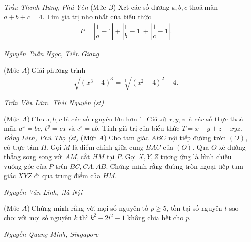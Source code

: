 \begin{multicols}{2}
\begin{figure}[H]
		\vspace*{-5pt}
		\centering
		\captionsetup{labelformat= empty, justification=centering}
		\vspace*{-15pt}
	\end{figure}
	\hfill	\textit{Trần Thanh Hưng, Phú Yên}
	\vskip 0.05cm
	{}
	(Mức $B$) Xét các số dương $a,b,c$ thoả mãn $a+b+c=4$. Tìm giá trị nhỏ nhất của biểu thức 
	\begin{align*}
		P=\left|\dfrac 1a-1\right|+\left|\dfrac 1b-1\right|+\left|\dfrac 1c-1\right|.
	\end{align*}
	\begin{flushright}
		\textit{Nguyễn Tuấn Ngọc, Tiền Giang}
	\end{flushright}
	{}
	(Mức $A$) Giải phương trình
	\begin{align*}
		\sqrt{(x^3-4)^3}=\sqrt[3]{(x^2+4)^2}+4.
	\end{align*} 
	\begin{flushright}
		\textit{Trần Văn Lâm, Thái Nguyên (st)}
	\end{flushright}
	{}
	(Mức $A$) Cho $a,b,c$ là các số nguyên lớn hơn $1$. Giả sử $x,y,z$ là các số thực thoả mãn $a^x=bc$, $b^y=ca$ và $c^z=ab$. Tính giá trị của biểu thức $T=x+y+z-xyz$. 
	\vskip 0.05cm
		\hfill \textit{Bằng Linh, Phú Thọ (st)}
	\vskip 0.05cm
	\columnbreak
	{}
	(Mức $A$) Cho tam giác $ABC$ nội tiếp đường tròn $(O)$, có trực tâm $H$. Gọi $M$ là điểm chính giữa cung $BAC$ của $(O)$. Qua $O$ kẻ đường thẳng  song song với $AM$, cắt $HM$ tại $P$. Gọi $X,Y,Z$ tương ứng là hình chiếu vuông góc của $P$ trên $BC,CA,AB$. Chứng minh rằng đường tròn ngoại tiếp tam giác $XYZ$ đi qua trung điểm của $HM.$
	\begin{figure}[H]
		\vspace*{-10pt}
		\centering
		\captionsetup{labelformat= empty, justification=centering}
		\vspace*{-15pt}
	\end{figure}
	\begin{flushright}
		\textit{Nguyễn Văn Linh, Hà Nội}
	\end{flushright}
	{}
	(Mức $A$) Chứng minh rằng với mọi số nguyên tố $p\ge5$, tồn tại số nguyên $t$ sao cho: với mọi số nguyên $k$ thì $k^2-2t^2-1$ không chia hết cho $p$.   
	\begin{flushright}
		\textit{Nguyễn Quang Minh, Singapore}
	\end{flushright}
\end{multicols}
